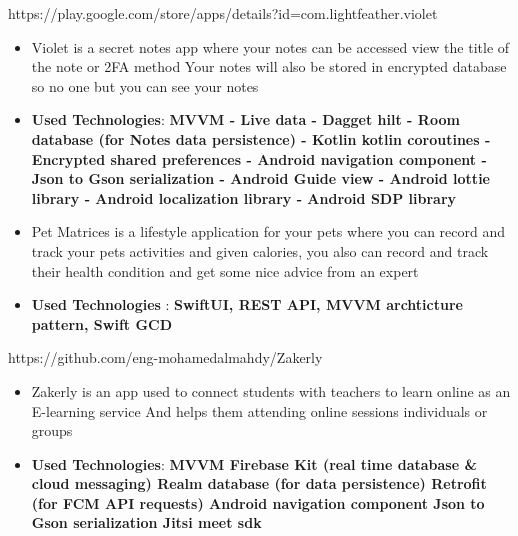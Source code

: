 \documentclass[10pt,a4paper,ragged2e,withhyper]{altacv}
\begin{document}
\begin{paracol}{1}
        {\cvrepo{|\faGithub\faAndroid\faGooglePlay}
        {https://play.google.com/store/apps/details?id=com.lightfeather.violet}}{}{}
        \begin{itemize}
            \item Violet is a secret notes app where your notes can be accessed view the title of the note or 2FA method Your notes will also be stored in encrypted database so no one but you can see your notes
            \item \textbf{Used Technologies}: \textbf{MVVM -
            Live data -
            Dagget hilt -
            Room database (for Notes data persistence) -
            Kotlin kotlin coroutines -
            Encrypted shared preferences -
            Android navigation component -
            Json to Gson serialization -
            Android Guide view -
            Android lottie library -
            Android localization library -
            Android SDP library}
        \end{itemize}
        \divider


        {\cvrepo{|\faLock\faApple}
        {}}{}{}
        \begin{itemize}
            \item \textbf{}Pet Matrices is a lifestyle application for your pets where you can record and track your pets activities and given calories, you also can record and track their health condition and get some nice advice from an expert
            \item \textbf{Used Technologies} : \textbf{SwiftUI, REST API, MVVM archticture pattern, Swift GCD}
        \end{itemize}
        \divider
        {\cvrepo{|\faGithub\faAndroid}
        {https://github.com/eng-mohamedalmahdy/Zakerly}}{}{}
        \begin{itemize}
            \item \textbf{}Zakerly is an app used to connect students with teachers to learn online as an E-learning service And helps them attending online sessions individuals or groups
            \item \textbf{Used Technologies}: \textbf{MVVM
            Firebase Kit (real time database \& cloud messaging)
                Realm database (for data persistence)
                Retrofit (for FCM API requests)
                Android navigation component
                Json to Gson serialization
                Jitsi meet sdk}
        \end{itemize}
        \divider


\end{paracol}
\end{document}
